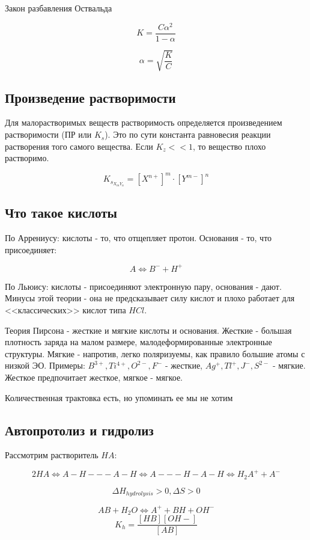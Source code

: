 \documentclass[11pt]{article}
\begin{document}
Закон разбавления Оствальда 

$$K = \frac{C\alpha^2}{1-\alpha} $$

$$\alpha = \sqrt{\frac{K}{C}}$$

\subsection{Произведение растворимости}

Для малорастворимых веществ растворимость определяется произведением растворимости (ПР или $K_s$). Это по сути константа равновесия реакции растворения того самого вещества. Если $K_z <<1$, то вещество плохо растворимо.

$$K_{s_{X_mY_n}} = [X^{n+}]^m\cdot[Y^{m-}]^n$$

\subsection{Что такое кислоты}

По Аррениусу: кислоты - то, что отщепляет протон. Основания - то, что присоединяет:

$$A \Leftrightarrow B^- + H^+$$

По Льюису: кислоты - присоединяют электронную пару, основания - дают. Минусы этой теории - она не предсказывает силу кислот и плохо работает для <<классических>> кислот типа $HCl$. 

Теория Пирсона - жесткие и мягкие кислоты и основания. Жесткие - большая плотность заряда на малом размере, малодеформированные электронные структуры. Мягкие - напротив, легко поляризуемы, как правило большие атомы с низкой ЭО. Примеры: $B^{3+}, Ti^{4+}, O^{2-}, F^{-}$ - жесткие, $Ag^+, Tl^+, J^-, S^{2-}$ - мягкие. Жесткое предпочитает жесткое, мягкое - мягкое.

Количественная трактовка есть, но упоминать ее мы не хотим

\subsection{Автопротолиз и гидролиз}

Рассмотрим растворитель $HA$:

$$2HA \Leftrightarrow A-H---A-H \Leftrightarrow A---H-A-H \Leftrightarrow H_2A^+ + A^-$$


$$\Delta H_{hydrolysis}>0, \Delta S >0$$

$$AB + H_2O \Leftrightarrow A^+ + BH + OH^-$$
$$K_h = \frac{[HB][OH-]}{[AB]}$$
\end{document}
